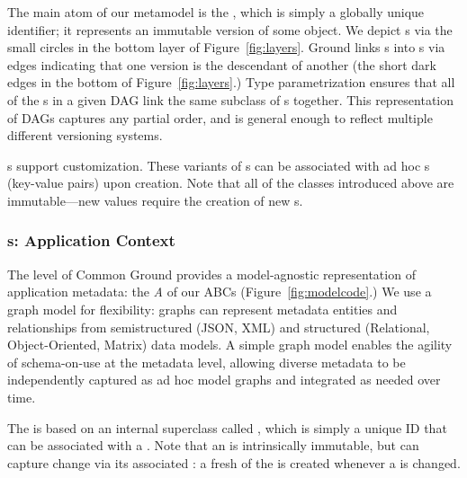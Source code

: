 \documentclass{sig-alternate}
\begin{document}
The main atom of our metamodel is the \version, which is simply a globally unique identifier; it represents an immutable version of some object. We
depict \version{}s via the small circles in the bottom layer of Figure~\ref{fig:layers}.
Ground links {\version}s into s via  edges
indicating that one version is the descendant of another (the short dark edges in the bottom of Figure~\ref{fig:layers}.)
Type parametrization ensures that all of the s in a given DAG link the same subclass of {\version}s together.
This representation of DAGs captures any partial order, and is general enough to reflect multiple different versioning systems.

s support customization. These variants of \version{}s can be associated with
ad hoc {\gtag}s (key-value pairs) upon creation. Note that all of the classes introduced above are immutable---new values require the creation of new \version{}s.

\subsubsection{{\ModelGraph}s: Application Context}


The \modelgraph level of Common Ground provides a model-agnostic representation of application metadata: the \emph{A} of our ABCs (Figure~\ref{fig:modelcode}.) 
We use a graph model for flexibility: graphs can represent metadata entities and relationships from
semistructured (JSON, XML) and structured (Relational, Object-Oriented, Matrix) data models. A simple graph model enables 
the agility of schema-on-use at the metadata level, allowing diverse metadata to be independently captured as ad hoc model graphs and 
integrated as needed over time.

The \modelgraph is based on an internal superclass called \itemground, which is simply a unique ID that can be
associated with a . Note that 
an \itemground is intrinsically immutable, but can capture change via its associated : a fresh
\version of the \itemground is created whenever a \gtag is changed. 
\end{document}
